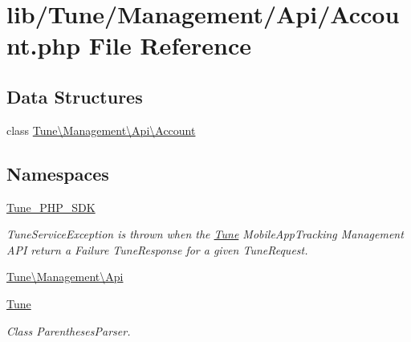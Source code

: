 \hypertarget{Account_8php}{\section{lib/\-Tune/\-Management/\-Api/\-Account.php File Reference}
\label{Account_8php}
}
\subsection*{Data Structures}
\begin{DoxyCompactItemize}
\item 
class \hyperlink{classTune_1_1Management_1_1Api_1_1Account}{Tune\textbackslash{}\-Management\textbackslash{}\-Api\textbackslash{}\-Account}
\end{DoxyCompactItemize}
\subsection*{Namespaces}
\begin{DoxyCompactItemize}
\item 
\hyperlink{namespaceTune__PHP__SDK}{Tune\-\_\-\-P\-H\-P\-\_\-\-S\-D\-K}
\begin{DoxyCompactList}\small\item\em Tune\-Service\-Exception is thrown when the \hyperlink{namespaceTune}{Tune} Mobile\-App\-Tracking Management A\-P\-I return a Failure Tune\-Response for a given Tune\-Request. \end{DoxyCompactList}\item 
\hyperlink{namespaceTune_1_1Management_1_1Api}{Tune\textbackslash{}\-Management\textbackslash{}\-Api}
\item 
\hyperlink{namespaceTune}{Tune}
\begin{DoxyCompactList}\small\item\em Class Parentheses\-Parser. \end{DoxyCompactList}\end{DoxyCompactItemize}
